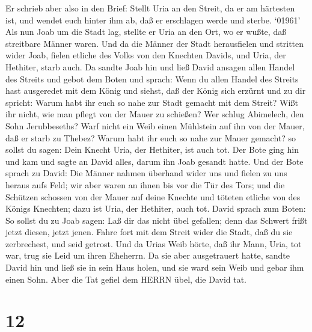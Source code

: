  Er schrieb aber also in den Brief: Stellt Uria an den
Streit, da er am härtesten ist, und wendet euch hinter ihm ab, daß er
erschlagen werde und sterbe.  `01961' Als nun Joab um die
Stadt lag, stellte er Uria an den Ort, wo er wußte, daß streitbare
Männer waren.  Und da die Männer der Stadt herausfielen und
stritten wider Joab, fielen etliche des Volks von den Knechten Davids,
und Uria, der Hethiter, starb auch.  Da sandte Joab hin und
ließ David ansagen allen Handel des Streits  und gebot dem
Boten und sprach: Wenn du allen Handel des Streits hast ausgeredet mit
dem König  und siehst, daß der König sich erzürnt und zu
dir spricht: Warum habt ihr euch so nahe zur Stadt gemacht mit dem
Streit? Wißt ihr nicht, wie man pflegt von der Mauer zu schießen?
 Wer schlug Abimelech, den Sohn Jerubbeseths? Warf nicht
ein Weib einen Mühlstein auf ihn von der Mauer, daß er starb zu Thebez?
Warum habt ihr euch so nahe zur Mauer gemacht? so sollst du sagen: Dein
Knecht Uria, der Hethiter, ist auch tot.  Der Bote ging hin
und kam und sagte an David alles, darum ihn Joab gesandt hatte.
 Und der Bote sprach zu David: Die Männer nahmen überhand
wider uns und fielen zu uns heraus aufs Feld; wir aber waren an ihnen
bis vor die Tür des Tors;  und die Schützen schossen von
der Mauer auf deine Knechte und töteten etliche von des Königs Knechten;
dazu ist Uria, der Hethiter, auch tot.  David sprach zum
Boten: So sollst du zu Joab sagen: Laß dir das nicht übel gefallen; denn
das Schwert frißt jetzt diesen, jetzt jenen. Fahre fort mit dem Streit
wider die Stadt, daß du sie zerbrechest, und seid getrost. 
Und da Urias Weib hörte, daß ihr Mann, Uria, tot war, trug sie Leid um
ihren Eheherrn.  Da sie aber ausgetrauert hatte, sandte
David hin und ließ sie in sein Haus holen, und sie ward sein Weib und
gebar ihm einen Sohn. Aber die Tat gefiel dem HERRN übel, die David tat.

\hypertarget{section-11}{%
\section{12}\label{section-11}}

